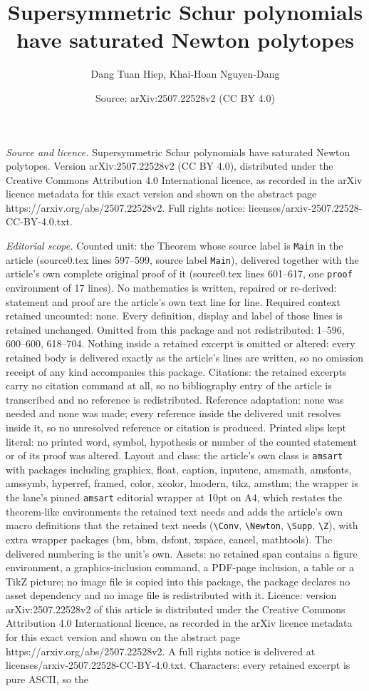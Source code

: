 \documentclass[10pt,a4paper]{amsart}
\title[Supersymmetric Schur polynomials have saturated Newton polyt]{Supersymmetric Schur polynomials have saturated Newton polytopes}
\author{Dang Tuan Hiep, Khai-Hoan Nguyen-Dang}
\date{Source: arXiv:2507.22528v2 (CC BY 4.0)}
\begin{document}
\maketitle

\noindent\emph{Source and licence.} Supersymmetric Schur polynomials have saturated Newton polytopes. Version arXiv:2507.22528v2 (CC BY 4.0), distributed under the Creative Commons Attribution 4.0 International licence, as recorded in the arXiv licence metadata for this exact version and shown on the abstract page https://arxiv.org/abs/2507.22528v2. Full rights notice: licenses/arxiv-2507.22528-CC-BY-4.0.txt.\par\smallskip

\noindent\textit{Editorial scope.} Counted unit: the Theorem whose source label is \texttt{Main} in the article (source0.tex lines 597--599, source label \texttt{Main}), delivered together with the article's own complete original proof of it (source0.tex lines 601--617, one \texttt{proof} environment of 17 lines). No mathematics is written, repaired or re-derived: statement and proof are the article's own text line for line. Required context retained uncounted: none. Every definition, display and label of those lines is retained unchanged. Omitted from this package and not redistributed: 1--596, 600--600, 618--704. Nothing inside a retained excerpt is omitted or altered: every retained body is delivered exactly as the article's lines are written, so no omission receipt of any kind accompanies this package. Citations: the retained excerpts carry no citation command at all, so no bibliography entry of the article is transcribed and no reference is redistributed. Reference adaptation: none was needed and none was made; every reference inside the delivered unit resolves inside it, so no unresolved reference or citation is produced. Printed slips kept literal: no printed word, symbol, hypothesis or number of the counted statement or of its proof was altered. Layout and class: the article's own class is \texttt{amsart} with packages including graphicx, float, caption, inputenc, amsmath, amsfonts, amssymb, hyperref, framed, color, xcolor, lmodern, tikz, amsthm; the wrapper is the lane's pinned \texttt{amsart} editorial wrapper at 10pt on A4, which restates the theorem-like environments the retained text needs and adds the article's own macro definitions that the retained text needs (\texttt{\textbackslash Conv}, \texttt{\textbackslash Newton}, \texttt{\textbackslash Supp}, \texttt{\textbackslash Z}), with extra wrapper packages (bm, bbm, dsfont, xspace, cancel, mathtools). The delivered numbering is the unit's own. Assets: no retained span contains a figure environment, a graphics-inclusion command, a PDF-page inclusion, a table or a TikZ picture; no image file is copied into this package, the package declares no asset dependency and no image file is redistributed with it. Licence: version arXiv:2507.22528v2 of this article is distributed under the Creative Commons Attribution 4.0 International licence, as recorded in the arXiv licence metadata for this exact version and shown on the abstract page https://arxiv.org/abs/2507.22528v2. A full rights notice is delivered at licenses/arxiv-2507.22528-CC-BY-4.0.txt. Characters: every retained excerpt is pure ASCII, so the 
\end{document}
